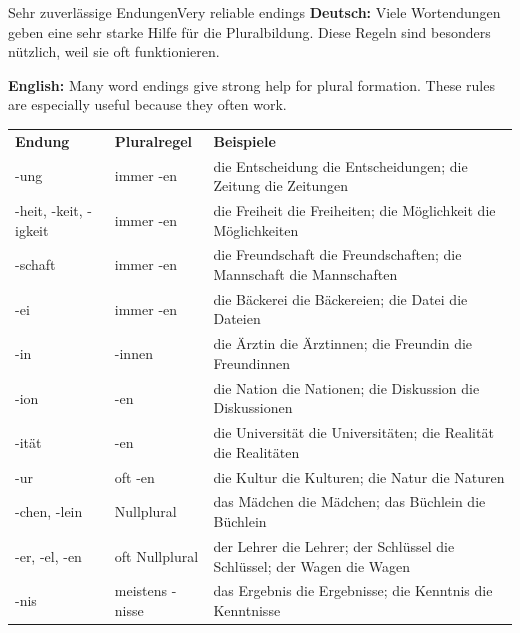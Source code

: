 \documentclass[a4paper,11pt]{article}
\newcommand{\GermanText}[1]{\textbf{Deutsch: }#1\par}
\newcommand{\EnglishText}[1]{{\small\color{SoftGray}\textbf{English: }#1\par}}
\newcommand{\TableHead}[3]{\rowcolor{HeaderBlueDark}\color{white}\textbf{#1} & \color{white}\textbf{#2} & \color{white}\textbf{#3}\\}
\begin{document}
\begin{grammarentry}{Sehr zuverlässige Endungen}{Very reliable endings}
\GermanText{Viele Wortendungen geben eine sehr starke Hilfe für die Pluralbildung. Diese Regeln sind besonders nützlich, weil sie oft funktionieren.}
\EnglishText{Many word endings give strong help for plural formation. These rules are especially useful because they often work.}

\renewcommand{\arraystretch}{1.35}
\begin{longtable}{>{\RaggedRight\arraybackslash}p{}>{\RaggedRight\arraybackslash}p{}>{\RaggedRight\arraybackslash}p{}}
\TableHead{Endung}{Pluralregel}{Beispiele}
\rowcolor{RowBlueLight} -ung & immer -en & die Entscheidung \textrightarrow{} die Entscheidungen; die Zeitung \textrightarrow{} die Zeitungen \\
\rowcolor{RowBlueDark} -heit, -keit, -igkeit & immer -en & die Freiheit \textrightarrow{} die Freiheiten; die Möglichkeit \textrightarrow{} die Möglichkeiten \\
\rowcolor{RowBlueLight} -schaft & immer -en & die Freundschaft \textrightarrow{} die Freundschaften; die Mannschaft \textrightarrow{} die Mannschaften \\
\rowcolor{RowBlueDark} -ei & immer -en & die Bäckerei \textrightarrow{} die Bäckereien; die Datei \textrightarrow{} die Dateien \\
\rowcolor{RowBlueLight} -in & -innen & die Ärztin \textrightarrow{} die Ärztinnen; die Freundin \textrightarrow{} die Freundinnen \\
\rowcolor{RowBlueDark} -ion & -en & die Nation \textrightarrow{} die Nationen; die Diskussion \textrightarrow{} die Diskussionen \\
\rowcolor{RowBlueLight} -ität & -en & die Universität \textrightarrow{} die Universitäten; die Realität \textrightarrow{} die Realitäten \\
\rowcolor{RowBlueDark} -ur & oft -en & die Kultur \textrightarrow{} die Kulturen; die Natur \textrightarrow{} die Naturen \\
\rowcolor{RowBlueLight} -chen, -lein & Nullplural & das Mädchen \textrightarrow{} die Mädchen; das Büchlein \textrightarrow{} die Büchlein \\
\rowcolor{RowBlueDark} -er, -el, -en & oft Nullplural & der Lehrer \textrightarrow{} die Lehrer; der Schlüssel \textrightarrow{} die Schlüssel; der Wagen \textrightarrow{} die Wagen \\
\rowcolor{RowBlueLight} -nis & meistens -nisse & das Ergebnis \textrightarrow{} die Ergebnisse; die Kenntnis \textrightarrow{} die Kenntnisse \\

\end{longtable}
\end{grammarentry}
\end{document}
